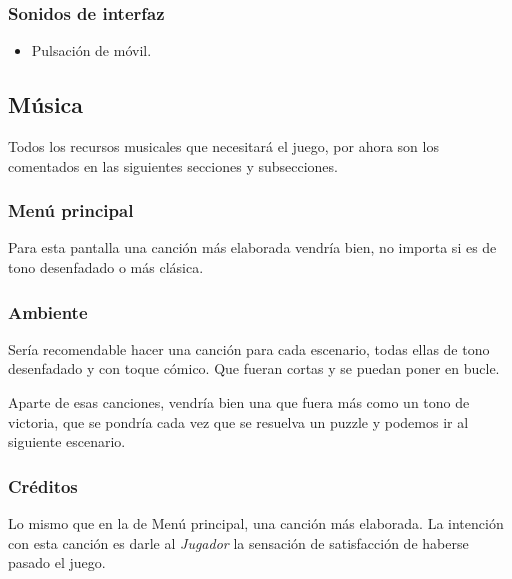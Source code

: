             \subsubsection{Sonidos de interfaz}
            \begin{itemize}
            \item Pulsación de móvil.
            \end{itemize}
            
        \subsection{Música}
        Todos los recursos musicales que necesitará el juego, por ahora son los comentados en las siguientes secciones y subsecciones.
            \subsubsection{Menú principal}
            Para esta pantalla una canción más elaborada vendría bien, no importa si es de tono desenfadado o más clásica.
            \subsubsection{Ambiente}
            Sería recomendable hacer una canción para cada escenario, todas ellas de tono desenfadado y con toque cómico. Que fueran cortas y se  puedan poner en bucle. 
            
            Aparte de esas canciones, vendría bien una que fuera más como un tono de victoria, que se pondría cada vez que se resuelva un puzzle y podemos ir al siguiente escenario.
            \subsubsection{Créditos}
            Lo mismo que en la de Menú principal, una canción más elaborada. La intención con esta canción es darle al \emph{Jugador} la sensación de satisfacción de haberse pasado el juego.